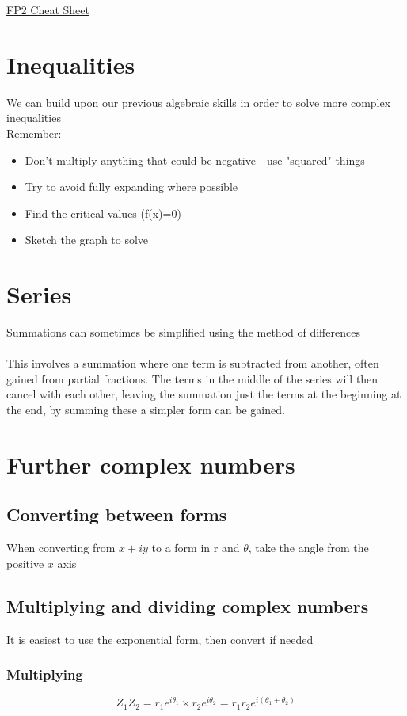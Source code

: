 \documentclass{article}[18pt]
\begin{document}
\begin{center}
\underline{\huge FP2 Cheat Sheet}
\end{center}
\section{Inequalities}
We can build upon our previous algebraic skills in order to solve more complex inequalities\\
Remember:
\begin{itemize}
\item Don't multiply anything that could be negative - use "squared" things
\item Try to avoid fully expanding where possible
\item Find the critical values (f(x)=0)
\item Sketch the graph to solve
\end{itemize}
\section{Series}
Summations can sometimes be simplified using the method of differences\\
\\
This involves a summation where one term is subtracted from another, often gained from partial fractions. The terms in the middle of the series will then cancel with each other, leaving the summation just the terms at the beginning at the end, by summing these a simpler form can be gained.
\section{Further complex numbers}
\subsection{Converting between forms}
When converting from $x+iy$ to a form in r and $\theta$, take the angle from the positive $x$ axis
\subsection{Multiplying and dividing complex numbers}
It is easiest to use the exponential form, then convert if needed
\subsubsection{Multiplying}
$$Z_1Z_2=r_1e^{i\theta_1}\times r_2e^{i\theta_2}=r_1r_2e^{i(\theta_1+\theta_2)}$$
\end{document}
